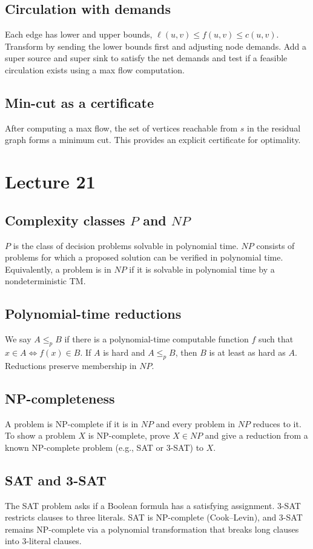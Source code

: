 \documentclass[11pt]{article}
\begin{document}
{{{{\subsection*{Circulation with demands}
Each edge has lower and upper bounds, $\ell(u,v) \le f(u,v) \le c(u,v)$. Transform by sending the
lower bounds first and adjusting node demands. Add a super source and super sink to satisfy the
net demands and test if a feasible circulation exists using a max flow computation.

\subsection*{Min-cut as a certificate}
After computing a max flow, the set of vertices reachable from $s$ in the residual graph forms a
minimum cut. This provides an explicit certificate for optimality.

\section{Lecture 21}

\subsection*{Complexity classes $P$ and $NP$}
$P$ is the class of decision problems solvable in polynomial time. $NP$ consists of problems for
which a proposed solution can be verified in polynomial time. Equivalently, a problem is in $NP$
if it is solvable in polynomial time by a nondeterministic TM.

\subsection*{Polynomial-time reductions}
We say $A \le_p B$ if there is a polynomial-time computable function $f$ such that
$x \in A \Leftrightarrow f(x) \in B$. If $A$ is hard and $A \le_p B$, then $B$ is at least as hard
as $A$. Reductions preserve membership in $NP$.

\subsection*{NP-completeness}
A problem is NP-complete if it is in $NP$ and every problem in $NP$ reduces to it. To show a
problem $X$ is NP-complete, prove $X \in NP$ and give a reduction from a known NP-complete
problem (e.g., SAT or 3-SAT) to $X$.

\subsection*{SAT and 3-SAT}
The SAT problem asks if a Boolean formula has a satisfying assignment. 3-SAT restricts clauses to
three literals. SAT is NP-complete (Cook--Levin), and 3-SAT remains NP-complete via a polynomial
transformation that breaks long clauses into 3-literal clauses.

}}}}
\end{document}
